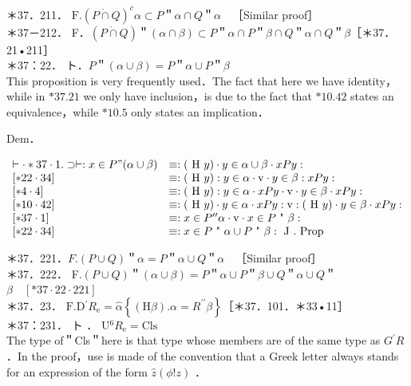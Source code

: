 \documentclass[10pt]{article}
\begin{document}
＊37．211． $\mathrm{F} .(P \dot{\cap} Q)^{c} \alpha \subset P$＂$\alpha \cap Q$＂$\alpha \quad$［Similar proof］\\
＊37－212． F．$(P \dot{\cap} Q)$＂$(\alpha \cap \beta) \subset P$＂$\alpha \cap P$＂$\beta \cap Q$＂$\alpha \cap Q$＂$\beta$［＊37．21•211］\\
＊37：22． ト．$P$＂$(\alpha \cup \beta)=P$＂$\alpha \cup P$＂$\beta$\\
This proposition is very frequently used．The fact that here we have identity，while in $* 37.21$ we only have inclusion，is due to the fact that $* 10.42$ states an equivalence，while $* 10.5$ only states an implication．

Dem．

$$
\begin{array}{ll}
\vdash \cdot * 37 \cdot 1 . \supset \vdash: x \in P "(\alpha \cup \beta) & \equiv:(\text { H } y) \cdot y \in \alpha \cup \beta \cdot x P y: \\
{[* 22 \cdot 34]} & \equiv:(\text { H } y): y \in \alpha \cdot \mathrm{v} \cdot y \in \beta: x P y: \\
{[* 4 \cdot 4]} & \equiv:(\text { H } y): y \in \alpha \cdot x P y \cdot \mathrm{v} \cdot y \in \beta \cdot x P y: \\
{[* 10 \cdot 42]} & \equiv:(\text { H } y) \cdot y \in \alpha \cdot x P y: \mathrm{v}:(\text { H } y) \cdot y \in \beta \cdot x P y: \\
{[* 37 \cdot 1]} & \equiv: x \in P^{\prime \prime} \alpha \cdot \mathrm{v} \cdot x \in P \text { " } \beta: \\
{[* 22 \cdot 34]} & \equiv: x \in P \text { " } \alpha \cup P \text { " } \beta: \text { J } . \text { Prop }
\end{array}
$$

＊37．221．$F .(P \cup Q)$＂$\alpha=P$＂$\alpha \cup Q$＂$\alpha \quad$［Similar proof］\\
＊37．222． F.$(P \cup Q)$＂$(\alpha \cup \beta)=P$＂$\alpha \cup P$＂$\beta \cup Q$＂$\alpha \cup Q$＂$\beta \quad[* 37 \cdot 22 \cdot 221]$\\
＊37．23． $\mathrm{F} . \mathrm{D}{ }^{\prime} R_{\mathrm{e}}=\hat{\alpha}\left\{(\mathrm{H} \beta) . \alpha=R^{\prime \prime} \beta\right\}$［＊37．101．＊33•11］\\
＊37：231． ト ． $\mathrm{U}{ }^{6} R_{\mathrm{e}}=\mathrm{Cls}$\\
The type of＂Cls＂here is that type whose members are of the same type as $G^{\prime} R$ ．In the proof，use is made of the convention that a Greek letter always stands for an expression of the form $\hat{z}(\phi!z)$ ．
\end{document}
